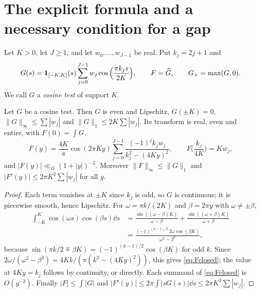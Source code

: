 \documentclass[11pt,colorlinks]{charlie}
\begin{document}
\section{The explicit formula and a necessary condition for a gap}\label{sec:explicit}

\begin{definition}\label{def:cosine}
Let $K>0$, let $J\ge1$, and let $w_0,\dots,w_{J-1}$ be real. Put $k_j=2j+1$ and
\[
 G(s)=\mathbf{1}_{[-K,K]}(s)\sum_{j=0}^{J-1}w_j\cos\Big(\frac{\pi k_js}{2K}\Big),\qquad F=\widehat G,\qquad G_+=\max(G,0).
\]
We call $G$ a \emph{cosine test} of support $K$.
\end{definition}

\begin{lemma}\label{lem:cosine}
Let $G$ be a cosine test. Then $G$ is even and Lipschitz, $G(\pm K)=0$, $\|G\|_\infty\le\sum|w_j|$ and $\|G\|_1\le2K\sum|w_j|$. Its transform is real, even and entire, with $F(0)=\int G$,
\begin{equation}\label{eq:Fclosed}
 F(y)=\frac{4K}{\pi}\cos(2\pi Ky)\sum_{j=0}^{J-1}\frac{(-1)^jk_jw_j}{k_j^2-(4Ky)^2},\qquad F\Big(\frac{k_j}{4K}\Big)=Kw_j,
\end{equation}
and $|F(y)|\ll_G(1+|y|)^{-2}$. Moreover $\|F\|_\infty\le\|G\|_1$ and $|F'(y)|\le2\pi K^2\sum|w_j|$ for all $y$.
\end{lemma}
\begin{proof}
Each term vanishes at $\pm K$ since $k_j$ is odd, so $G$ is continuous; it is piecewise smooth, hence Lipschitz. For $\omega=\pi k/(2K)$ and $\beta=2\pi y$ with $\omega\ne\pm\beta$,
\begin{align*}
 \int_{-K}^K\cos(\omega s)\cos(\beta s)\dd s&=\frac{\sin((\omega-\beta)K)}{\omega-\beta}+\frac{\sin((\omega+\beta)K)}{\omega+\beta}\\
 &=\frac{(-1)^{(k-1)/2}\,2\omega\cos(\beta K)}{\omega^2-\beta^2},
\end{align*}
because $\sin(\pi k/2\mp\beta K)=(-1)^{(k-1)/2}\cos(\beta K)$ for odd $k$. Since $2\omega/(\omega^2-\beta^2)=4Kk/(\pi(k^2-(4Ky)^2))$, this gives \eqref{eq:Fclosed}; the value at $4Ky=k_j$ follows by continuity, or directly. Each summand of \eqref{eq:Fclosed} is $O(y^{-2})$. Finally $|F|\le\int|G|$ and $|F'(y)|\le2\pi\int|sG(s)|\dd s\le2\pi K^2\sum|w_j|$.
\end{proof}
\end{document}
